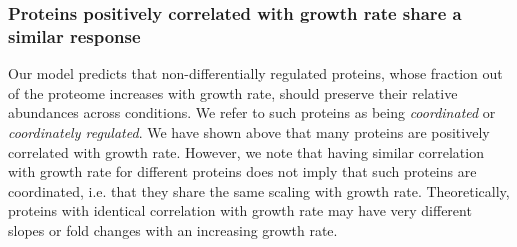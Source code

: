 \subsubsection{Proteins positively correlated with growth rate share a similar response}
\label{propchange} 
Our model predicts that non-differentially regulated proteins, whose fraction out of the proteome increases with growth rate, should preserve their relative abundances across conditions.
We refer to such proteins as being \emph{coordinated} or \emph{coordinately regulated}.
We have shown above that many proteins are positively correlated with growth rate.
However, we note that having similar correlation with growth rate for different proteins does not imply that such proteins are coordinated, i.e. that they share the same scaling with growth rate.
Theoretically, proteins with identical correlation with growth rate may have very different slopes or fold changes with an increasing growth rate.
